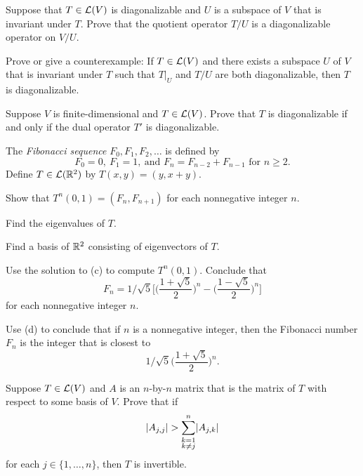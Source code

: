\begin{exc}
\begin{exercise}
Suppose that $T\in\mathcal{L}(V)$ is diagonalizable and $U$ is a subspace of $V$ that
is invariant under $T$. Prove that the quotient operator $T/U$ is a
diagonalizable operator on $V/U$.
\end{exercise}

\begin{exercise}
Prove or give a counterexample: If $T\in\mathcal{L}(V)$ and there exists a subspace $U$
of $V$ that is invariant under $T$ such that $T|_U$ and $T/U$ are both
diagonalizable, then $T$ is diagonalizable.
\end{exercise}

\begin{exercise}
Suppose $V$ is finite-dimensional and $T\in\mathcal{L}(V)$. Prove that $T$ is
diagonalizable if and only if the dual operator $T'$ is diagonalizable.
\end{exercise}

\begin{exercise}
The \emph{Fibonacci sequence} $F_0,F_1,F_2,\dots$ is defined by
\[ F_0=0,\ F_1=1,\ \text{and } F_n=F_{n-2}+F_{n-1} \text{ for } n\ge2. \]
Define $T\in\mathcal{L}(\mathbb{R}^2)$ by $T(x,y)=(y,x+y)$.
\begin{parts}
\item Show that $T^n(0,1)=(F_n,F_{n+1})$ for each nonnegative integer $n$.
\item Find the eigenvalues of $T$.
\item Find a basis of $\mathbb{R}^2$ consisting of eigenvectors of $T$.
\item Use the solution to (c) to compute $T^n(0,1)$. Conclude that
  \[ F_n=1/\sqrt5\biggl[\biggl(\frac{1+\sqrt5}{2}\biggr)^{\!n}
     -\biggl(\frac{1-\sqrt5}{2}\biggr)^{\!n}\biggr] \]
  for each nonnegative integer $n$.
\item Use (d) to conclude that if $n$ is a nonnegative integer, then the
  Fibonacci number $F_n$ is the integer that is closest to
  \[ 1/\sqrt5\biggl(\frac{1+\sqrt5}{2}\biggr)^{\!n}. \]
\end{parts}
\end{exercise}

\begin{exercise}
Suppose $T\in\mathcal{L}(V)$ and $A$ is an $n$-by-$n$ matrix that is the matrix of $T$
with respect to some basis of $V$. Prove that if
\[ \lvert A_{j,j} \rvert>\sum_{\substack{k=1\\k\ne j}}^n \lvert A_{j,k} \rvert \]
for each $j\in\{1,\dots,n\}$, then $T$ is invertible.
\end{exercise}


\end{exc}

